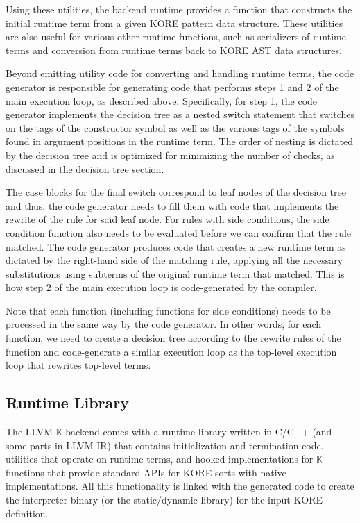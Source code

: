 \documentclass{article}
\theoremstyle{definition}
\newcommand{\K}{$\mathbb{K}$\xspace}
\newcommand{\KL}{LLVM-\K}
\begin{document}
Using these utilities, the backend runtime provides a function that constructs the initial runtime term from a given KORE pattern data structure. These utilities are also useful for various other runtime functions, such as serializers of runtime terms and conversion from runtime terms back to KORE AST data structures.

Beyond emitting utility code for converting and handling runtime terms, the code generator is responsible for generating code that performs steps 1 and 2 of the main execution loop, as described above. Specifically, for step 1, the code generator implements the decision tree as a nested switch statement that switches on the tags of the constructor symbol as well as the various tags of the symbols found in argument positions in the runtime term. The order of nesting is dictated by the decision tree and is optimized for minimizing the number of checks, as discussed in the decision tree section.

The case blocks for the final switch correspond to leaf nodes of the decision tree and thus, the code generator needs to fill them with code that implements the rewrite of the rule for said leaf node. For rules with side conditions, the side condition function also needs to be evaluated before we can confirm that the rule matched. The code generator produces code that creates a new runtime term as dictated by the right-hand side of the matching rule, applying all the necessary substitutions using subterms of the original runtime term that matched. This is how step 2 of the main execution loop is code-generated by the compiler.

Note that each function (including functions for side conditions) needs to be processed in the same way by the code generator. In other words, for each function, we need to create a decision tree according to the rewrite rules of the function and code-generate a similar execution loop as the top-level execution loop that rewrites top-level terms.


\subsection{Runtime Library}
The \KL backend comes with a runtime library written in C/C++ (and some parts in LLVM IR) that contains initialization and termination code, utilities that operate on runtime terms, and hooked implementations for \K functions that provide standard APIs for KORE sorts with native implementations. All this functionality is linked with the generated code to create the interpreter binary (or the static/dynamic library) for the input KORE definition.
\end{document}
